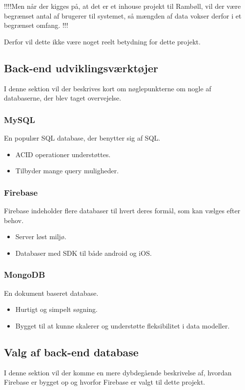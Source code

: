 !!!!Men når der kigges på, at det er et inhouse projekt til Rambøll, vil der være begrænset antal af brugerer til systemet, så mængden af data vokser derfor i et begrænset omfang. !!!

Derfor vil dette ikke være noget reelt betydning for dette projekt.

\subsection{Back-end udviklingsværktøjer}
I denne sektion vil der beskrives kort om nøglepunkterne om nogle af databaserne, der blev taget overvejelse. 

\subsubsection{MySQL\cite{MySQL}}
En populær SQL database, der benytter sig af SQL.
\begin{itemize}[-]
	\item ACID\cite{ACID} operationer understøttes.
	\item Tilbyder mange query muligheder.
\end{itemize}

\subsubsection{Firebase\cite{Firebase}}
Firebase indeholder flere databaser til hvert deres formål, som kan vælges efter behov. 
\begin{itemize}[-]
	\item Server løst miljø.
	\item Databaser med SDK til både android og iOS.
\end{itemize}

\subsubsection{MongoDB\cite{mongoDB}}
En dokument baseret database.
\begin{itemize}[-]
	\item Hurtigt og simpelt søgning.
	\item Bygget til at kunne skalerer og understøtte fleksibilitet i data modeller.  \\
	
\end{itemize}

\subsection{Valg af back-end database}
I denne sektion vil der komme en mere dybdegående beskrivelse af, hvordan Firebase er bygget op og hvorfor Firebase er valgt til dette projekt.\\


